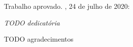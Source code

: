 \documentclass[
	12pt,	%
	openright,			%
	oneside,            %
	a4paper,			%
	english,			%
	french,				%
	spanish,			%
	brazil				%
]{abntex2}
\begin{document}
\begin{folhadeaprovacao}

  \begin{center}
    {\ABNTEXchapterfont\large\imprimirautor}

    \vspace*{\fill}\vspace*{\fill}
    \begin{center}
      \ABNTEXchapterfont\bfseries\Large\imprimirtitulo
    \end{center}
    \vspace*{\fill}
    
    \hspace{.45\textwidth}
    \begin{minipage}{.5\textwidth}
        \imprimirpreambulo
    \end{minipage}%
    \vspace*{\fill}
   \end{center}
        
   Trabalho aprovado. \imprimirlocal, 24 de julho de 2020:

      
   \begin{center}
    \vspace*{0.5cm}
    {\large\imprimirlocal}
    \par
    {\large\imprimirdata}
    \vspace*{1cm}
  \end{center}
  
\end{folhadeaprovacao}


\begin{dedicatoria}
   \vspace*{\fill}
   \centering
   \noindent
   \textit{ TODO dedicatória } \vspace*{\fill}
\end{dedicatoria}

\begin{agradecimentos}
TODO agradecimentos

\end{agradecimentos}
\end{document}
